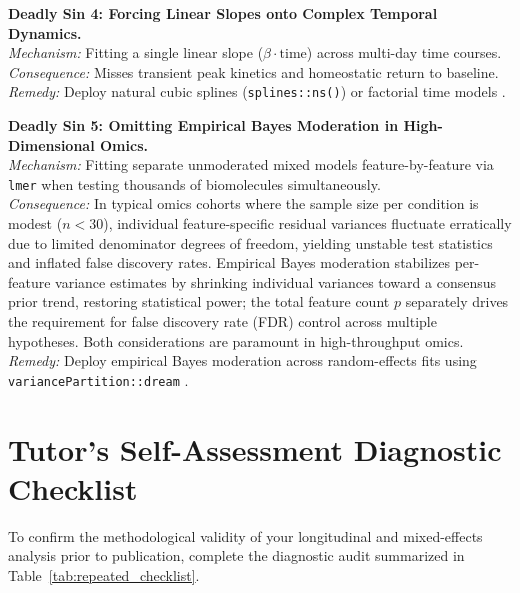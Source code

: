 \documentclass[11pt,twoside,openright]{book}
\begin{document}
\begin{pitfallbox}
\textbf{Deadly Sin 4: Forcing Linear Slopes onto Complex Temporal Dynamics.}\\
\textit{Mechanism:} Fitting a single linear slope ($\beta \cdot \text{time}$) across multi-day time courses.\\
\textit{Consequence:} Misses transient peak kinetics and homeostatic return to baseline.\\
\textit{Remedy:} Deploy natural cubic splines (\texttt{splines::ns()}) or factorial time models \cite{wood2017generalized}.
\end{pitfallbox}

\begin{pitfallbox}
\textbf{Deadly Sin 5: Omitting Empirical Bayes Moderation in High-Dimensional Omics.}\\
\textit{Mechanism:} Fitting separate unmoderated mixed models feature-by-feature via \texttt{lmer} when testing thousands of biomolecules simultaneously.\\
\textit{Consequence:} In typical omics cohorts where the sample size per condition is modest ($n < 30$), individual feature-specific residual variances fluctuate erratically due to limited denominator degrees of freedom, yielding unstable test statistics and inflated false discovery rates. Empirical Bayes moderation stabilizes per-feature variance estimates by shrinking individual variances toward a consensus prior trend, restoring statistical power; the total feature count $p$ separately drives the requirement for false discovery rate (FDR) control across multiple hypotheses. Both considerations are paramount in high-throughput omics.\\
\textit{Remedy:} Deploy empirical Bayes moderation across random-effects fits using \texttt{variancePartition::dream} \cite{hoffman2021dream, ritchie2015limma}.
\end{pitfallbox}

\section{Tutor's Self-Assessment Diagnostic Checklist}

To confirm the methodological validity of your longitudinal and mixed-effects analysis prior to publication, complete the diagnostic audit summarized in Table~\ref{tab:repeated_checklist}.
\end{document}
